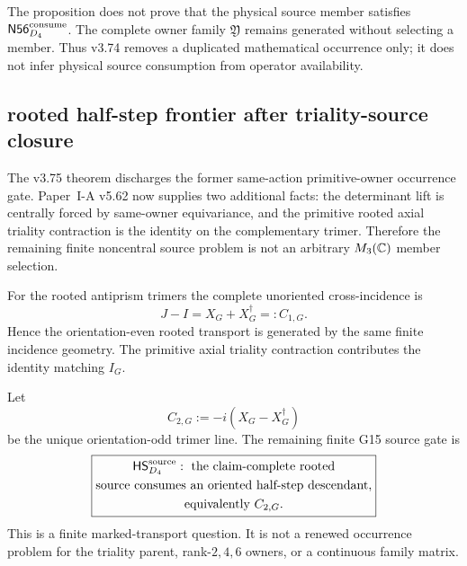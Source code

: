 \documentclass[11pt,a4paper]{article}
\begin{document}
\begin{remark}
\label{p5:rem:v374-no-hidden-selection}
The proposition does not prove that the physical source member satisfies
\(\mathsf{N56}_{D_4}^{\rm consume}\).  The complete owner family
\(\mathfrak Y\) remains generated without selecting a member.  Thus v3.74
removes a duplicated mathematical occurrence only; it does not infer physical
source consumption from operator availability.
\end{remark}


\subsection{rooted half-step frontier after triality-source closure}
\label{p5:sec:v376-d4-rooted-halfstep-frontier}

The v3.75 theorem discharges the former same-action primitive-owner occurrence
gate.  Paper~I-A v5.62 now supplies two additional facts: the determinant lift
is centrally forced by same-owner equivariance, and the primitive rooted axial
triality contraction is the identity on the complementary trimer.  Therefore
the remaining finite noncentral source problem is not an arbitrary
\(M_3(\mathbb{C})\) member selection.

\begin{proposition}
\label{p5:prop:v376-even-rooted-transport-generated}
For the rooted antiprism trimers the complete unoriented cross-incidence is
\[
 J-I=X_G+X_G^\dagger=:C_{1,G}.
\]
Hence the orientation-even rooted transport is generated by the same finite
incidence geometry.  The primitive axial triality contraction contributes the
identity matching \(I_G\).
\end{proposition}

\begin{definition}
\label{p5:def:v376-halfstep-source-gate}
Let
\[
 C_{2,G}:=-i(X_G-X_G^\dagger)
\]
be the unique orientation-odd trimer line.  The remaining finite G15 source
gate is
\[
 \boxed{\begin{gathered}
 \mathsf{HS}_{D_4}^{\rm source}:\ \text{the claim-complete rooted}\\
 \text{source consumes an oriented half-step descendant,}\\
 \text{equivalently }C_{2,G}.
 \end{gathered}}
\]
This is a finite marked-transport question.  It is not a renewed occurrence
problem for the triality parent, rank-\(2,4,6\) owners, or a continuous family
matrix.
\end{definition}
\end{document}
